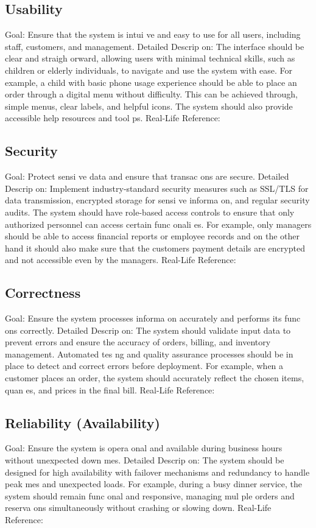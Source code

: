 \documentclass{article}
\begin{document}
\subsection{Usability} 
Goal: Ensure that the system is intui ve and easy to use for all users, including staff, 
customers, and management. 
Detailed Descrip on: The interface should be clear and straigh orward, allowing users with 
minimal technical skills, such as children or elderly individuals, to navigate and use the 
system with ease. For example, a child with basic phone usage experience should be able to 
place an order through a digital menu without difficulty. This can be achieved through, 
simple menus, clear labels, and helpful icons. The system should also provide accessible help 
resources and tool ps. 
Real-Life Reference:  
\subsection{Security}
Goal: Protect sensi ve data and ensure that transac ons are secure. 
Detailed Descrip on: Implement industry-standard security measures such as SSL/TLS for 
data transmission, encrypted storage for sensi ve informa on, and regular security audits. 
The system should have role-based access controls to ensure that only authorized personnel 
can access certain func onali es. For example, only managers should be able to access 
financial reports or employee records and on the other hand it should also make sure that 
the customers payment details are encrypted and not accessible even by the managers. 
Real-Life Reference: 
\subsection{Correctness}
Goal: Ensure the system processes informa on accurately and performs its func ons 
correctly. 
Detailed Descrip on: The system should validate input data to prevent errors and ensure 
the accuracy of orders, billing, and inventory management. Automated tes ng and quality 
assurance processes should be in place to detect and correct errors before deployment. For 
example, when a customer places an order, the system should accurately reflect the chosen 
items, quan es, and prices in the final bill. 
Real-Life Reference:  
\subsection{Reliability (Availability)} 
Goal: Ensure the system is opera onal and available during business hours without 
unexpected down mes. 
Detailed Descrip on: The system should be designed for high availability with failover 
mechanisms and redundancy to handle peak mes and unexpected loads. For example, 
during a busy dinner service, the system should remain func onal and responsive, managing 
mul ple orders and reserva ons simultaneously without crashing or slowing down. 
Real-Life Reference:  
\end{document}
